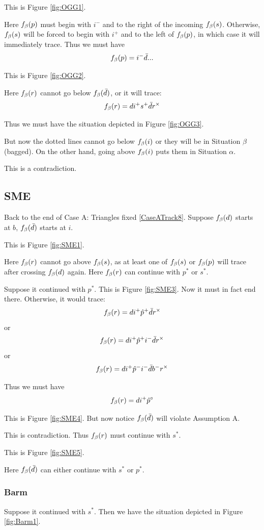 This is Figure \ref{fig:OGG1}.

Here $f_\beta(p)$ must begin with $i^-$ and to the right of the incoming $f_\beta(s)$. Otherwise, $f_\beta(s)$ will be forced to begin with $i^+$ and to the left of $f_\beta(p)$, in which case it will immediately trace. Thus we must have 
\[
f_\beta(p) = i^- \bar{d}...
\]

This is Figure \ref{fig:OGG2}.

Here $f_\beta(r)$ cannot go below $f_\beta(\bar{d})$, or it will trace:
\[
f_\beta(r) = d i^+ s^+ \bar{d} r^\times
\]

Thus we must have the situation depicted in Figure \ref{fig:OGG3}.

But now the dotted lines cannot go below $f_\beta(i)$ or they will be in Situation $\beta$ (bagged). On the other hand, going above $f_\beta(i)$ puts them in Situation $\alpha$.

This is a contradiction.

\subsection{SME}\label{SME}
Back to the end of Case A: Triangles fixed \ref{CaseATrack8}. Suppose $f_\beta(d)$ starts at $b$,
$f_\beta(\bar{d})$ starts at $i$.

This is Figure \ref{fig:SME1}.

Here $f_\beta(r)$ cannot go above $f_\beta(s)$, as at least one of $f_\beta(s)$ or $f_\beta(p)$ will trace after crossing $f_\beta(d)$ again. Here $f_\beta(r)$ can continue with $p^*$ or $s^*$.

Suppose it continued with $p^*$. This is Figure \ref{fig:SME3}. Now it must in fact end there. Otherwise, it would trace:
\[
f_\beta(r) = d i^+ \hat{p}^+\bar{d} r^\times
\]
or
\[
f_\beta(r) = d i^+ \hat{p}^+i^- \bar{d} r^\times
\]
or
\[
f_\beta(r) = d i^+ \hat{p}^- i^- \bar{d} b^- r^\times
\]

Thus we must have
\[
f_\beta(r) = d i^+ \hat{p}^\circ
\]

This is Figure \ref{fig:SME4}. But now notice $f_\beta(\bar{d})$ will violate Assumption A.

This is contradiction. Thus $f_\beta(r)$ must continue with $s^*$. 

This is Figure \ref{fig:SME5}.

Here $f_\beta(\bar{d})$ can either continue with $s^*$ or $p^*$.

\subsubsection{Barm}\label{Barm}
Suppose it continued with $s^*$. Then we have the situation depicted in Figure \ref{fig:Barm1}.


